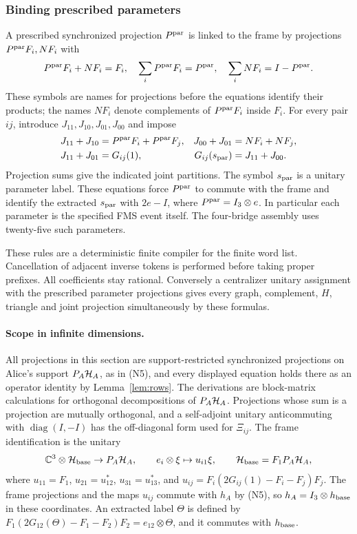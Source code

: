 \subsubsection{Binding prescribed parameters}
A prescribed synchronized projection $P^{\rm par}$ is linked to the frame by projections $P^{\rm par}F_i,NF_i$ with
\[
 P^{\rm par}F_i+NF_i=F_i,\quad \sum_iP^{\rm par}F_i=P^{\rm par},\quad\sum_iNF_i=I-P^{\rm par}.
\]
These symbols are names for projections before the equations identify their products; the names $NF_i$ denote complements of $P^{\rm par}F_i$ inside $F_i$. For every pair $ij$, introduce $J_{11},J_{10},J_{01},J_{00}$ and impose
\begin{align*}
 J_{11}+J_{10}&=P^{\rm par}F_i+P^{\rm par}F_j,&
 J_{00}+J_{01}&=NF_i+NF_j,\\
 J_{11}+J_{01}&=G_{ij}(1),&
 G_{ij}(s_{\rm par})&=J_{11}+J_{00}.
\end{align*}
Projection sums give the indicated joint partitions. The symbol $s_{\rm par}$ is a unitary parameter label. These equations force $P^{\rm par}$ to commute with the frame and identify the extracted $s_{\rm par}$ with $2e-I$, where $P^{\rm par}=I_3\otimes e$. In particular each parameter is the specified FMS event itself. The four-bridge assembly uses twenty-five such parameters.

These rules are a deterministic finite compiler for the finite word list. Cancellation of adjacent inverse tokens is performed before taking proper prefixes. All coefficients stay rational. Conversely a centralizer unitary assignment with the prescribed parameter projections gives every graph, complement, $H$, triangle and joint projection simultaneously by these formulas.

\paragraph{Scope in infinite dimensions.}
All projections in this section are support-restricted synchronized projections on Alice's support $P_A\mathcal H_A$, as in (N5), and every displayed equation holds there as an operator identity by Lemma~\ref{lem:rows}. The derivations are block-matrix calculations for orthogonal decompositions of $P_A\mathcal H_A$. Projections whose sum is a projection are mutually orthogonal, and a self-adjoint unitary anticommuting with $\operatorname{diag}(I,-I)$ has the off-diagonal form used for $\Xi_{ij}$. The frame identification is the unitary
\[
 \mathbb C^3\otimes\mathcal H_{\rm base}\to P_A\mathcal H_A,\qquad e_i\otimes\xi\mapsto u_{i1}\xi,\qquad \mathcal H_{\rm base}=F_1P_A\mathcal H_A,
\]
where $u_{11}=F_1$, $u_{21}=u_{12}^*$, $u_{31}=u_{13}^*$, and $u_{ij}=F_i(2G_{ij}(1)-F_i-F_j)F_j$. The frame projections and the maps $u_{ij}$ commute with $h_A$ by (N5), so $h_A=I_3\otimes h_{\rm base}$ in these coordinates. An extracted label $\Theta$ is defined by $F_1(2G_{12}(\Theta)-F_1-F_2)F_2=e_{12}\otimes\Theta$, and it commutes with $h_{\rm base}$.

